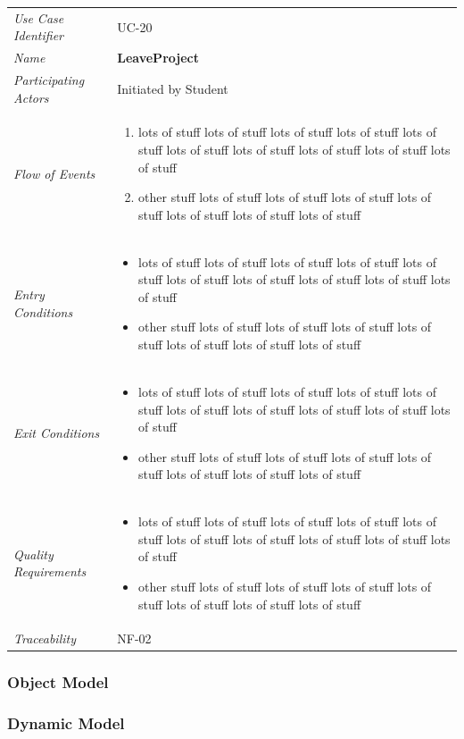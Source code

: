 \documentclass[12pt,letterpaper]{article}
\begin{document}
\begin{center}
	\begin{tabu} to 
		\toprule
		Use Case Identifier & UC-20 \\
		Name & {\bf LeaveProject} \\
		Participating Actors & Initiated by Student \\
		Flow of Events & 
	    \begin{enumerate}[topsep=-1em]
		    \item lots of stuff lots of stuff lots of stuff lots of stuff lots of stuff lots of stuff lots of stuff lots of stuff lots of stuff lots of stuff
		    \item other stuff lots of stuff lots of stuff lots of stuff lots of stuff lots of stuff lots of stuff lots of stuff
		\end{enumerate} \\

		Entry Conditions &
		\begin{itemize}[topsep=-1em]
		    \item lots of stuff lots of stuff lots of stuff lots of stuff lots of stuff lots of stuff lots of stuff lots of stuff lots of stuff lots of stuff
		    \item other stuff lots of stuff lots of stuff lots of stuff lots of stuff lots of stuff lots of stuff lots of stuff
        \end{itemize} \\

		Exit Conditions &
		\begin{itemize}[topsep=-1em]
		    \item lots of stuff lots of stuff lots of stuff lots of stuff lots of stuff lots of stuff lots of stuff lots of stuff lots of stuff lots of stuff
		    \item other stuff lots of stuff lots of stuff lots of stuff lots of stuff lots of stuff lots of stuff lots of stuff
        \end{itemize} \\

		Quality Requirements &
		\begin{itemize}[topsep=-1em]
		    \item lots of stuff lots of stuff lots of stuff lots of stuff lots of stuff lots of stuff lots of stuff lots of stuff lots of stuff lots of stuff
		    \item other stuff lots of stuff lots of stuff lots of stuff lots of stuff lots of stuff lots of stuff lots of stuff
        \end{itemize} \\

		Traceability & NF-02 \\
		\toprule
	\end{tabu}
\end{center}

\subsubsection{Object Model}


\subsubsection{Dynamic Model}
\end{document}
